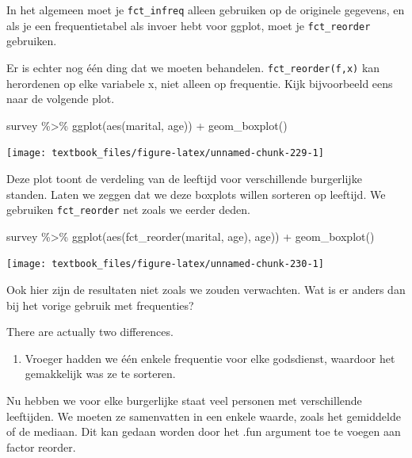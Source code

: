 \documentclass[]{tufte-book}
\newenvironment{Shaded}{}{}
\newcommand{\FunctionTok}[1]{\textcolor[rgb]{0.02,0.16,0.49}{#1}}
\newcommand{\NormalTok}[1]{#1}
\newcommand{\SpecialCharTok}[1]{\textcolor[rgb]{0.25,0.44,0.63}{#1}}
\providecommand{\tightlist}{%
  \setlength{\itemsep}{0pt}\setlength{\parskip}{0pt}}
\begin{document}
In het algemeen moet je \texttt{fct\_infreq} alleen gebruiken op de originele gegevens, en als je een frequentietabel als invoer hebt voor ggplot, moet je \texttt{fct\_reorder} gebruiken.

Er is echter nog één ding dat we moeten behandelen. \texttt{fct\_reorder(f,x)} kan herordenen op elke variabele x, niet alleen op frequentie. Kijk bijvoorbeeld eens naar de volgende plot.

\begin{Shaded}
\begin{Highlighting}[]
\NormalTok{survey }\SpecialCharTok{\%\textgreater{}\%}
  \FunctionTok{ggplot}\NormalTok{(}\FunctionTok{aes}\NormalTok{(marital, age)) }\SpecialCharTok{+}
  \FunctionTok{geom\_boxplot}\NormalTok{()}
\end{Highlighting}
\end{Shaded}

\texttt{[image: textbook\_files/figure-latex/unnamed-chunk-229-1]}

Deze plot toont de verdeling van de leeftijd voor verschillende burgerlijke standen. Laten we zeggen dat we deze boxplots willen sorteren op leeftijd. We gebruiken \texttt{fct\_reorder} net zoals we eerder deden.

\begin{Shaded}
\begin{Highlighting}[]
\NormalTok{survey }\SpecialCharTok{\%\textgreater{}\%}
  \FunctionTok{ggplot}\NormalTok{(}\FunctionTok{aes}\NormalTok{(}\FunctionTok{fct\_reorder}\NormalTok{(marital, age), age)) }\SpecialCharTok{+}
  \FunctionTok{geom\_boxplot}\NormalTok{()}
\end{Highlighting}
\end{Shaded}

\texttt{[image: textbook\_files/figure-latex/unnamed-chunk-230-1]}

Ook hier zijn de resultaten niet zoals we zouden verwachten. Wat is er anders dan bij het vorige gebruik met frequenties?

There are actually two differences.

\begin{enumerate}
\def\labelenumi{\arabic{enumi}.}
\tightlist
\item
  Vroeger hadden we één enkele frequentie voor elke godsdienst, waardoor het gemakkelijk was ze te sorteren.
\end{enumerate}

Nu hebben we voor elke burgerlijke staat veel personen met verschillende leeftijden. We moeten ze samenvatten in een enkele waarde, zoals het gemiddelde of de mediaan. Dit kan gedaan worden door het .fun argument toe te voegen aan factor reorder.
\end{document}
